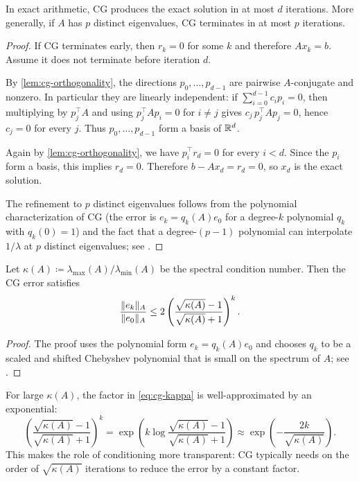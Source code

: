 \begin{theorem}
\label{thm:cg-finite}
In exact arithmetic, CG produces the exact solution in at most $d$ iterations.
More generally, if $A$ has $p$ distinct eigenvalues, CG terminates in at most $p$ iterations.
\end{theorem}
\begin{proof}
If CG terminates early, then $r_k=0$ for some $k$ and therefore $Ax_k=b$.
Assume it does not terminate before iteration $d$.

By \cref{lem:cg-orthogonality}, the directions $p_0,\dots,p_{d-1}$ are pairwise $A$-conjugate and nonzero.
In particular they are linearly independent: if $\sum_{i=0}^{d-1} c_i p_i=0$, then multiplying by $p_j^\top A$ and using $p_j^\top A p_i=0$ for $i\neq j$ gives $c_j\,p_j^\top A p_j=0$, hence $c_j=0$ for every $j$.
Thus $p_0,\dots,p_{d-1}$ form a basis of $\mathbb{R}^d$.

Again by \cref{lem:cg-orthogonality}, we have $p_i^\top r_d=0$ for every $i<d$.
Since the $p_i$ form a basis, this implies $r_d=0$.
Therefore $b-Ax_d=r_d=0$, so $x_d$ is the exact solution.

The refinement to $p$ distinct eigenvalues follows from the polynomial characterization of CG (the error is $e_k = q_k(A)e_0$ for a degree-$k$ polynomial $q_k$ with $q_k(0)=1$) and the fact that a degree-$(p-1)$ polynomial can interpolate $1/\lambda$ at $p$ distinct eigenvalues; see \citet[Thm.~11.3.1]{golub_van_loan_2013_matrix_computations}.
\end{proof}

\begin{theorem}
\label{thm:cg-kappa}
Let $\kappa(A)\coloneqq \lambda_{\max}(A)/\lambda_{\min}(A)$ be the spectral condition number.
Then the CG error satisfies
\begin{equation}
  \frac{\lVert e_k\rVert_A}{\lVert e_0\rVert_A}
  \le 2\left(\frac{\sqrt{\kappa(A)}-1}{\sqrt{\kappa(A)}+1}\right)^k.
  \label{eq:cg-kappa}
\end{equation}
\end{theorem}
\begin{proof}
The proof uses the polynomial form $e_k=q_k(A)e_0$ and chooses $q_k$ to be a scaled and shifted Chebyshev polynomial that is small on the spectrum of $A$; see \citet[\S11.3]{golub_van_loan_2013_matrix_computations}.
\end{proof}

For large $\kappa(A)$, the factor in \eqref{eq:cg-kappa} is well-approximated by an exponential:
\[
  \left(\frac{\sqrt{\kappa(A)}-1}{\sqrt{\kappa(A)}+1}\right)^k
  = \exp\!\left(k\log\frac{\sqrt{\kappa(A)}-1}{\sqrt{\kappa(A)}+1}\right)
  \approx \exp\!\left(-\frac{2k}{\sqrt{\kappa(A)}}\right).
\]
This makes the role of conditioning more transparent: CG typically needs on the order of $\sqrt{\kappa(A)}$ iterations to reduce the error by a constant factor.

